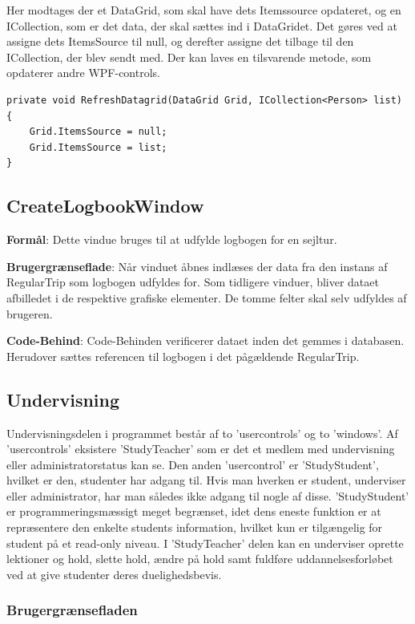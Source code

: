 Her modtages der et DataGrid, som skal have dets Itemssource opdateret, og en ICollection, som er det data, der skal sættes ind i DataGridet. 
Det gøres ved at assigne dets ItemsSource til null, og derefter assigne det tilbage til den ICollection, der blev sendt med. 
Der kan laves en tilsvarende metode, som opdaterer andre WPF-controls.

\begin{lstlisting}[frame=single, caption=Refresh Datagrid, label=RefreshDatagrid]
private void RefreshDatagrid(DataGrid Grid, ICollection<Person> list)
{
    Grid.ItemsSource = null;
    Grid.ItemsSource = list;
}
\end{lstlisting}

\subsection{CreateLogbookWindow}

\textbf{Formål}: 
Dette vindue bruges til at udfylde logbogen for en sejltur.

\textbf{Brugergrænseflade}:  
Når vinduet åbnes indlæses der data fra den instans af RegularTrip som logbogen udfyldes for.
Som tidligere vinduer, bliver dataet afbilledet i de respektive grafiske elementer. 
De tomme felter skal selv udfyldes af brugeren. 

\textbf{Code-Behind}: 
Code-Behinden verificerer dataet inden det gemmes i databasen.
Herudover sættes referencen til logbogen i det pågældende RegularTrip.

\subsection{Undervisning}
Undervisningsdelen i programmet består af to 'usercontrols' og to 'windows'.
Af 'usercontrols' eksistere 'StudyTeacher' som er det et medlem med undervisning eller administratorstatus kan se.
Den anden 'usercontrol' er 'StudyStudent', hvilket er den, studenter har adgang til. Hvis man hverken er student, underviser eller administrator, har man således ikke adgang til nogle af disse. 
'StudyStudent' er programmeringsmæssigt meget begrænset, idet dens eneste funktion er at repræsentere den enkelte students information, hvilket kun er tilgængelig for student på et read-only niveau.
I 'StudyTeacher' delen kan en underviser oprette lektioner og hold, slette hold, ændre på hold samt fuldføre uddannelsesforløbet ved at give studenter deres duelighedsbevis.

\subsubsection{Brugergrænsefladen}
